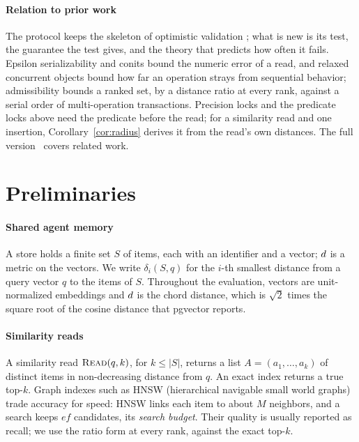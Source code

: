 \documentclass[sigconf, nonacm, review]{acmart}
\begin{document}
\paragraph{Relation to prior work}
The protocol keeps the skeleton of optimistic validation
\cite{DBLP:journals/tods/KungR81}; what is new is its test, the
guarantee the test gives, and the theory that predicts how often it
fails. Epsilon serializability
\cite{DBLP:conf/sigmod/PuL91,DBLP:journals/tkde/RamamrithamP95} and
conits \cite{DBLP:journals/tocs/YuV02} bound the numeric error of a
read, and relaxed concurrent objects
\cite{DBLP:conf/opodis/AfekKY10,DBLP:conf/popl/HenzingerKPSS13} bound
how far an operation strays from sequential behavior; admissibility
bounds a ranked set, by a distance ratio at every rank, against a serial order of
multi-operation transactions. Precision locks
\cite{DBLP:conf/sigmod/JordanBB81} and the predicate locks above need
the predicate before the read; for a similarity read and one insertion,
Corollary~\ref{cor:radius} derives it from the read's own distances.
The full version~\cite[App.~G]{ariadnefull} covers related work.

\section{Preliminaries}
\label{sec:setting}

\paragraph{Shared agent memory}
A store holds a finite set $S$ of items, each with an identifier and a
vector; $d$ is a metric on the vectors. We write $\delta_i(S,q)$ for
the $i$-th smallest distance from a query vector $q$ to the items of
$S$. Throughout the evaluation, vectors are unit-normalized embeddings
and $d$ is the chord distance, which is $\sqrt{2}$ times the square
root of the cosine distance that pgvector reports.

\paragraph{Similarity reads}
A similarity read $\textsc{Read}(q,k)$, for $k\le|S|$, returns a list
$A=(a_1,\dots,a_k)$ of distinct items in non-decreasing distance from
$q$. An exact index returns a true top-$k$. Graph indexes such as HNSW (hierarchical navigable small world graphs)
\cite{DBLP:journals/pami/MalkovY20,DBLP:journals/is/MalkovPLK14,DBLP:journals/pvldb/FuXWC19,DBLP:journals/pvldb/WangXYW21,DBLP:journals/tkde/LiZSWLZL20}
trade accuracy for speed: HNSW links each item to about $M$ neighbors,
and a search keeps $\mathit{ef}$ candidates, its \emph{search budget}.
Their quality is usually reported as recall; we use the ratio form
\cite{DBLP:conf/stoc/IndykM98} at every rank, against the exact top-$k$.
\end{document}

